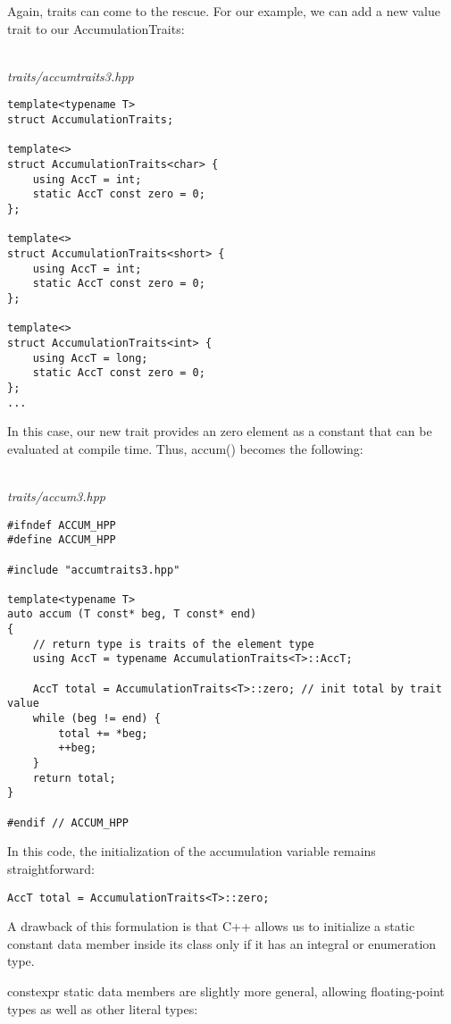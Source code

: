 Again, traits can come to the rescue. For our example, we can add a new value trait to our AccumulationTraits:

\hspace*{\fill} \\ %
\noindent
\textit{traits/accumtraits3.hpp}
\begin{lstlisting}[style=styleCXX]
template<typename T>
struct AccumulationTraits;

template<>
struct AccumulationTraits<char> {
	using AccT = int;
	static AccT const zero = 0;
};

template<>
struct AccumulationTraits<short> {
	using AccT = int;
	static AccT const zero = 0;
};

template<>
struct AccumulationTraits<int> {
	using AccT = long;
	static AccT const zero = 0;
};
...
\end{lstlisting}

In this case, our new trait provides an zero element as a constant that can be evaluated at compile time. Thus, accum() becomes the following:

\hspace*{\fill} \\ %
\noindent
\textit{traits/accum3.hpp}
\begin{lstlisting}[style=styleCXX]
#ifndef ACCUM_HPP
#define ACCUM_HPP

#include "accumtraits3.hpp"

template<typename T>
auto accum (T const* beg, T const* end)
{
	// return type is traits of the element type
	using AccT = typename AccumulationTraits<T>::AccT;
	
	AccT total = AccumulationTraits<T>::zero; // init total by trait value
	while (beg != end) {
		total += *beg;
		++beg;
	}
	return total;
}

#endif // ACCUM_HPP
\end{lstlisting}

In this code, the initialization of the accumulation variable remains straightforward:

\begin{lstlisting}[style=styleCXX]
AccT total = AccumulationTraits<T>::zero;
\end{lstlisting}

A drawback of this formulation is that C++ allows us to initialize a static constant data member inside its class only if it has an integral or enumeration type.

constexpr static data members are slightly more general, allowing floating-point types as well as other literal types:

